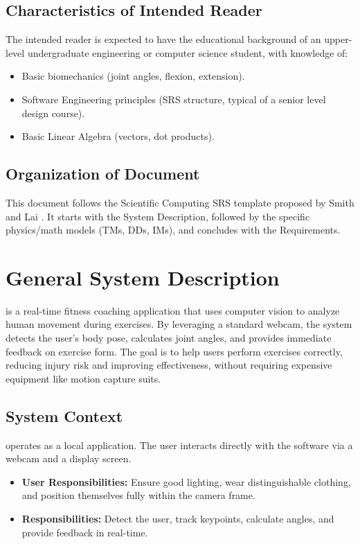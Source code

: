 \documentclass[12pt]{article}
\begin{document}
\subsection{Characteristics of Intended Reader} \label{sec_IntendedReader}
The intended reader is expected to have the educational background of an upper-level undergraduate engineering or computer science student, with knowledge of:
\begin{itemize}
    \item Basic biomechanics (joint angles, flexion, extension).
    \item Software Engineering principles (SRS structure, typical of a senior level design course).
    \item Basic Linear Algebra (vectors, dot products).
\end{itemize}

\subsection{Organization of Document}
This document follows the Scientific Computing SRS template proposed by Smith and Lai \cite{SmithAndLai2005}. It starts with the System Description, followed by the specific physics/math models (TMs, DDs, IMs), and concludes with the Requirements.
  

\section{General System Description}

\progname{} is a real-time fitness coaching application that uses computer vision to analyze human movement during exercises. By leveraging a standard webcam, the system detects the user's body pose, calculates joint angles, and provides immediate feedback on exercise form. The goal is to help users perform exercises correctly, reducing injury risk and improving effectiveness, without requiring expensive equipment like motion capture suits.

\subsection{System Context}
\progname{} operates as a local application. The user interacts directly with the software via a webcam and a display screen.
\begin{itemize}
    \item \textbf{User Responsibilities:} Ensure good lighting, wear distinguishable clothing, and position themselves fully within the camera frame.
    \item \textbf{\progname{} Responsibilities:} Detect the user, track keypoints, calculate angles, and provide feedback in real-time.
\end{itemize}
\end{document}
